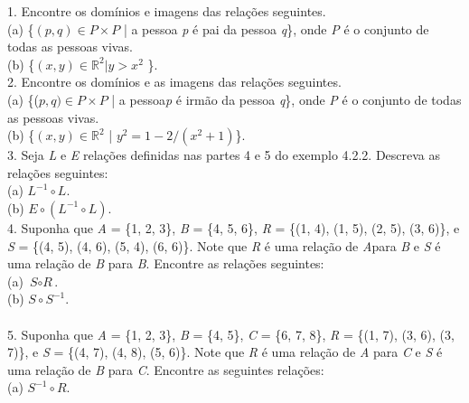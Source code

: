 1. Encontre os domínios e imagens das relações seguintes.
\\

(a) \{$(\textit{p}, \textit{q}) \in \textit{P} \times \textit{P}$ | a pessoa \textit{p} é pai da pessoa \textit{q}\}, onde \textit{P} é o conjunto de todas as pessoas vivas.
\\

(b) \{$(\textit{x}, \textit{y}) \in \mathbb{R}^{2} | \textit{y} > \textit{x}^{2}$ \}.
\\
2. Encontre os domínios e as imagens das relações seguintes.
\\

(a) \{($\textit{p}, \textit{q}) \in \textit{P} \times \textit{P}$ | a pessoa\textit{p} é irmão da pessoa \textit{q}\}, onde \textit{P} é o conjunto de todas as pessoas vivas.
\\

(b) \{$(\textit{x}, \textit{y}) \in \mathbb{R}^{2}$ | $\textit{y}^{2} = 1 - 2/(\textit{x}^{2} + 1)$\}.
\\
3. Seja \textit{L} e \textit{E} relações definidas nas partes 4 e 5 do exemplo 4.2.2. Descreva as relações seguintes:
\\

(a) $\textit{L}^{-1} \circ \textit{L}$.
\\

(b) $\textit{E} \circ (\textit{L}^{-1} \circ \textit{L})$.
\\
4. Suponha que \textit{A} = \{1, 2, 3\}, \textit{B} = \{4, 5, 6\}, \textit{R} = \{(1, 4), (1, 5), (2, 5), (3, 6)\}, e \textit{S} = \{(4, 5), (4, 6), (5, 4), (6, 6)\}. Note que \textit{R} é uma relação de \textit{A}para \textit{B} e \textit{S} é uma relação de \textit{B} para \textit{B}. Encontre as relações seguintes:
\\

(a) $\textit{S} \circ \textit{R}$.
\\

(b) $\textit{S} \circ \textit{S}^{-1}$.
\\
\\
5. Suponha que \textit{A} = \{1, 2, 3\}, \textit{B} = \{4, 5\}, \textit{C} = \{6, 7, 8\}, \textit{R} = \{(1, 7), (3, 6), (3, 7)\}, e \textit{S} = \{(4, 7), (4, 8), (5, 6)\}. Note que \textit{R} é uma relação de \textit{A} para \textit{C} e \textit{S} é uma relação de \textit{B} para \textit{C}. Encontre as seguintes relações:
\\

(a) $\textit{S}^{-1} \circ \textit{R}$.
\\

